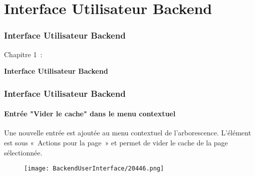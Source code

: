%

\section{Interface Utilisateur Backend}
\begin{frame}[fragile]
	\frametitle{Interface Utilisateur Backend}

	\begin{center}\huge{Chapitre 1~:}\end{center}
	\begin{center}\huge{\color{typo3darkgrey}\textbf{Interface Utilisateur Backend}}\end{center}

\end{frame}

\begin{frame}[fragile]
	\frametitle{Interface Utilisateur Backend}
	\framesubtitle{Entrée "Vider le cache" dans le menu contextuel}

	Une nouvelle entrée est ajoutée au menu contextuel de l'arborescence. L'élément est sous
	«~Actions pour la page~» et permet de vider le cache de la page sélectionnée.

	\begin{figure}
		\texttt{[image: BackendUserInterface/20446.png]}
	\end{figure}

\end{frame}

